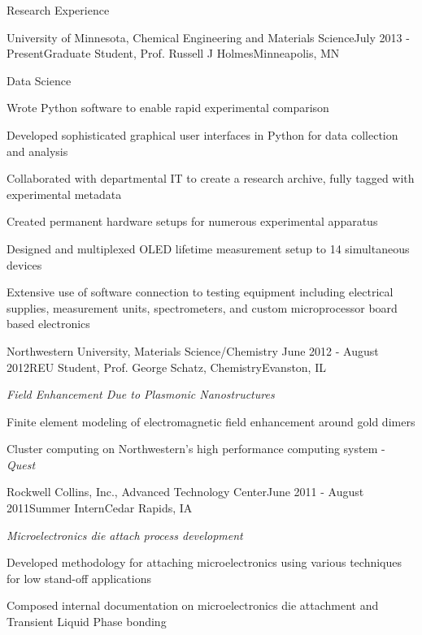 \documentclass{resume} %
\begin{document}
\begin{rSection}{Research Experience}
\begin{rSubsection}{University of Minnesota, Chemical Engineering and Materials Science}{July 2013 - Present}{Graduate Student, Prof. Russell J Holmes}{Minneapolis, MN}
\begin{rSubsubsection}{Data Science}
\item Wrote Python software to enable rapid experimental comparison
\item Developed sophisticated graphical user interfaces in Python for data collection and analysis
\item Collaborated with departmental IT to create a research archive, fully tagged with experimental metadata
\item Created permanent hardware setups for numerous experimental apparatus
\item Designed and multiplexed OLED lifetime measurement setup to 14 simultaneous devices
\item Extensive use of software connection to testing equipment including electrical supplies, measurement units, spectrometers, and custom microprocessor board based electronics
\end{rSubsubsection}
\end{rSubsection}


\begin{samepage}
\begin{rSubsection}{Northwestern University, Materials Science/Chemistry }{June 2012 - August 2012}{REU Student, Prof. George Schatz, Chemistry}{Evanston, IL}

\item {\em Field Enhancement Due to Plasmonic Nanostructures}
\item Finite element modeling of electromagnetic field enhancement around gold dimers
\item Cluster computing on Northwestern's high performance computing system - {\em Quest}
\end{rSubsection}
\end{samepage}


\begin{rSubsection}{Rockwell Collins, Inc., Advanced Technology Center}{June 2011 - August 2011}{Summer Intern}{Cedar Rapids, IA}
\item {\em Microelectronics die attach process development}
\item Developed methodology for attaching microelectronics using various techniques for low stand-off applications
\item Composed internal documentation on microelectronics die attachment and Transient Liquid Phase bonding
\end{rSubsection}


\end{rSection}
\end{document}
